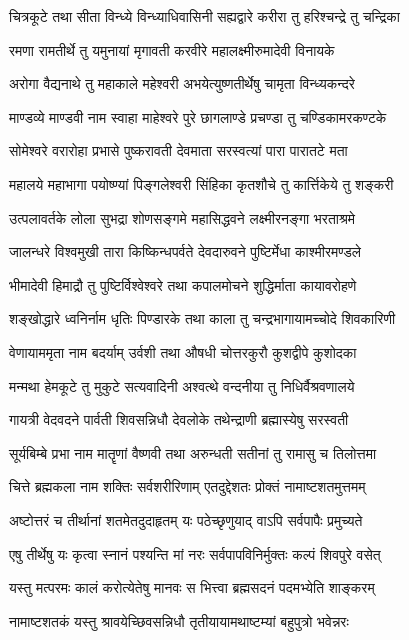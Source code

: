 \twolineshloka
{चित्रकूटे तथा सीता विन्ध्ये विन्ध्याधिवासिनी}
{सह्यद्वारे करीरा तु हरिश्चन्द्रे तु चन्द्रिका}

\twolineshloka
{रमणा रामतीर्थे तु यमुनायां मृगावती}
{करवीरे महालक्ष्मीरुमादेवी विनायके}

\twolineshloka
{अरोगा वैद्यनाथे तु महाकाले महेश्वरी}
{अभयेत्युष्णतीर्थेषु चामृता विन्ध्यकन्दरे}

\twolineshloka
{माण्डव्ये माण्डवी नाम स्वाहा माहेश्वरे पुरे}
{छागलाण्डे प्रचण्डा तु चण्डिकामरकण्टके}

\twolineshloka
{सोमेश्वरे वरारोहा प्रभासे पुष्करावती}
{देवमाता सरस्वत्यां पारा पारातटे मता}

\twolineshloka
{महालये महाभागा पयोष्ण्यां पिङ्गलेश्वरी}
{सिंहिका कृतशौचे तु कार्त्तिकेये तु शङ्करी}

\twolineshloka
{उत्पलावर्तके लोला सुभद्रा शोणसङ्गमे}
{महासिद्धवने लक्ष्मीरनङ्गा भरताश्रमे}

\twolineshloka
{जालन्धरे विश्वमुखी तारा किष्किन्धपर्वते}
{देवदारुवने पुष्टिर्मेधा काश्मीरमण्डले}

\twolineshloka
{भीमादेवी हिमाद्रौ तु पुष्टिर्विश्वेश्वरे तथा}
{कपालमोचने शुद्धिर्माता कायावरोहणे}

\twolineshloka
{शङ्खोद्धारे ध्वनिर्नाम धृतिः पिण्डारके तथा}
{काला तु चन्द्रभागायामच्चोदे शिवकारिणी}

\twolineshloka
{वेणायाममृता नाम बदर्याम् उर्वशी तथा}
{औषधी चोत्तरकुरौ कुशद्वीपे कुशोदका}

\twolineshloka
{मन्मथा हेमकूटे तु मुकुटे सत्यवादिनी}
{अश्वत्थे वन्दनीया तु निधिर्वैश्रवणालये}

\twolineshloka
{गायत्री वेदवदने पार्वती शिवसन्निधौ}
{देवलोके तथेन्द्राणी ब्रह्मास्येषु सरस्वती}

\twolineshloka
{सूर्यबिम्बे प्रभा नाम मातॄणां वैष्णवी तथा}
{अरुन्धती सतीनां तु रामासु च तिलोत्तमा}

\twolineshloka
{चित्ते ब्रह्मकला नाम शक्तिः सर्वशरीरिणाम्}
{एतदुद्देशतः प्रोक्तं नामाष्टशतमुत्तमम्}

\twolineshloka
{अष्टोत्तरं च तीर्थानां शतमेतदुदाहृतम्}
{यः पठेच्छृणुयाद् वाऽपि सर्वपापैः प्रमुच्यते}

\twolineshloka
{एषु तीर्थेषु यः कृत्वा स्नानं पश्यन्ति मां नरः}
{सर्वपापविनिर्मुक्तः कल्पं शिवपुरे वसेत्}

\twolineshloka
{यस्तु मत्परमः कालं करोत्येतेषु मानवः}
{स भित्त्वा ब्रह्मसदनं पदमभ्येति शाङ्करम्}

\twolineshloka
{नामाष्टशतकं यस्तु श्रावयेच्छिवसन्निधौ}
{तृतीयायामथाष्टम्यां बहुपुत्रो भवेन्नरः}

